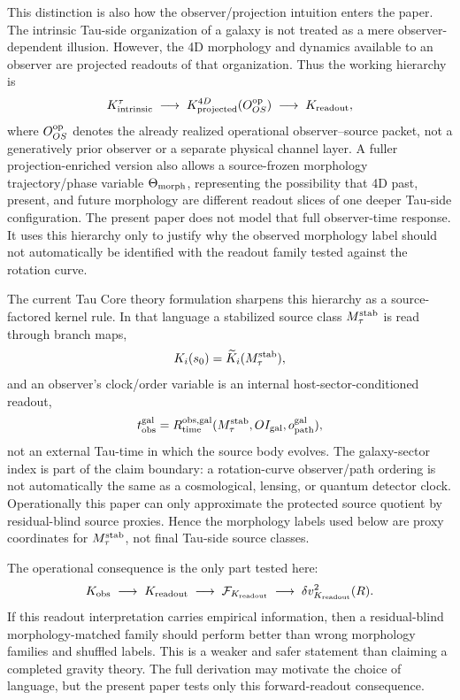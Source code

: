 \documentclass[11pt]{article}
\begin{document}
This distinction is also how the observer/projection intuition enters the
paper.  The intrinsic Tau-side organization of a galaxy is not treated as a
mere observer-dependent illusion.  However, the 4D morphology and dynamics
available to an observer are projected readouts of that organization.  Thus the
working hierarchy is
\[
K_{\rm intrinsic}^{\tau}
\;\longrightarrow\;
K_{\rm projected}^{4D}(O_{OS}^{\rm op})
\;\longrightarrow\;
K_{\rm readout},
\]
where \(O_{OS}^{\rm op}\) denotes the already realized operational
observer--source packet, not a generatively prior observer or a separate
physical channel layer.  A fuller
projection-enriched version also allows a source-frozen morphology
trajectory/phase variable \(\Theta_{\rm morph}\), representing the possibility
that 4D past, present, and future morphology are different readout slices of
one deeper Tau-side configuration.  The present paper does not model that full
observer-time response.  It uses this hierarchy only to justify why the
observed morphology label should not automatically be identified with the
readout family tested against the rotation curve.

The current Tau Core theory formulation sharpens this hierarchy as a
source-factored kernel rule.  In that language a stabilized source class
\(M_\tau^{\rm stab}\) is read through branch maps,
\[
K_i(s_0)=\widetilde K_i(M_\tau^{\rm stab}),
\]
and an observer's clock/order variable is an internal host-sector-conditioned
readout,
\[
t_{\rm obs}^{\rm gal}
=R_{\rm time}^{\rm obs,gal}
(M_\tau^{\rm stab},OI_{\rm gal},o_{\rm path}^{\rm gal}),
\]
not an external Tau-time in which the source body evolves.  The galaxy-sector
index is part of the claim boundary: a rotation-curve observer/path ordering is
not automatically the same as a cosmological, lensing, or quantum detector
clock.  Operationally this
paper can only approximate the protected source quotient by residual-blind
source proxies.  Hence the morphology labels used below are proxy coordinates
for \(M_\tau^{\rm stab}\), not final Tau-side source classes.

The operational consequence is the only part tested here:
\[
K_{\rm obs}
\;\longrightarrow\;
K_{\rm readout}
\;\longrightarrow\;
\mathcal{F}_{K_{\rm readout}}
\;\longrightarrow\;
\delta v^2_{K_{\rm readout}}(R).
\]
If this readout interpretation carries empirical information, then a
residual-blind morphology-matched family should perform better than wrong
morphology families and shuffled labels.  This is a weaker and safer statement
than claiming a completed gravity theory.  The full derivation may motivate the
choice of language, but the present paper tests only this forward-readout
consequence.
\end{document}

